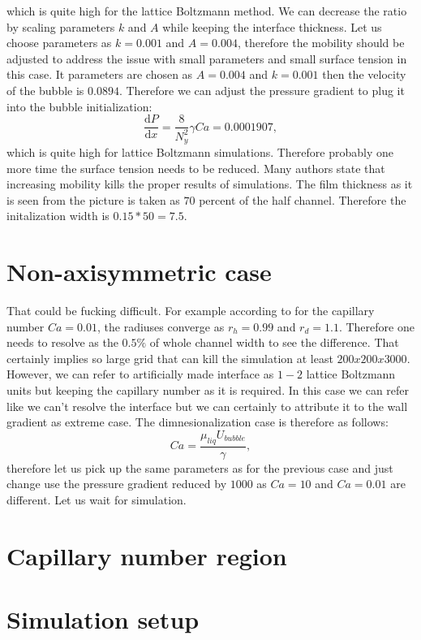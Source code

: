 \documentclass{article}
\begin{document}
which is quite high for the lattice Boltzmann method. We can decrease the ratio by scaling
parameters $k$ and $A$ while keeping the interface thickness. Let us choose parameters as $k=0.001$
and $A=0.004$, therefore the mobility should be adjusted to address the issue with small parameters
and small surface tension in this case. It parameters are chosen as $A=0.004$ and $k=0.001$ then
the velocity of the bubble is  $0.0894$. Therefore we can adjust the pressure gradient to plug it
into the bubble initialization:
\begin{equation}
\frac{\mathrm{d}P}{\mathrm{d}x}=\frac{8}{N_y^2} \gamma Ca=0.0001907,
\end{equation}
which is quite high for lattice Boltzmann simulations. Therefore probably one more time the surface
tension needs to be reduced. {\color{red} Many authors state that increasing mobility kills the
proper results of simulations}. 
The film thickness as it is seen from the picture is taken as $70$ percent of the half channel.
Therefore the initalization width is $0.15*50=7.5$. 

\section{Non-axisymmetric case}
That could be fucking difficult. For example according to \cite{heil-threedim} for the capillary
number $Ca=0.01$, the radiuses converge as $r_h=0.99$ and $r_d=1.1$. Therefore one needs to resolve
as the $0.5\%$ of whole channel width to see the difference. That certainly implies so large grid
that can kill the simulation at least $200x200x3000$. However, we can refer to artificially made
interface as $1-2$ lattice Boltzmann units but keeping the capillary number as it is required. In
this case we can refer like we can't resolve the interface but we can certainly to attribute it to
the wall gradient as extreme case. The dimnesionalization case is therefore as follows:
\begin{equation}
Ca=\frac{\mu_{liq} U_{bubble}}{\gamma},
\end{equation}
therefore let us pick up the same parameters as for the previous case and just change use the
pressure gradient reduced by $1000$ as $Ca=10$ and $Ca=0.01$ are different. 
Let us wait for simulation.

\section{Capillary number region}



\section{Simulation setup}




\end{document}
